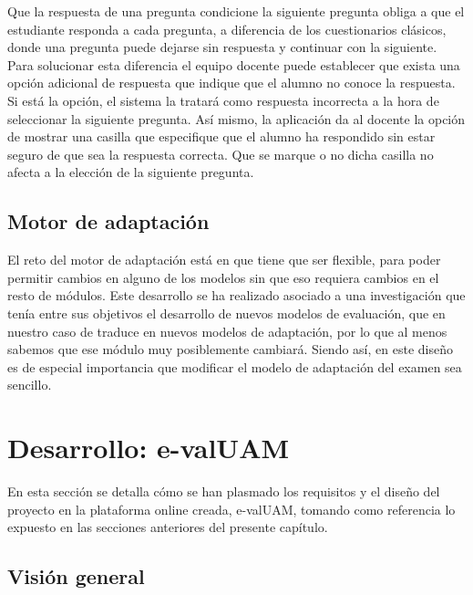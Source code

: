 Que la respuesta de una pregunta condicione la siguiente pregunta obliga a que el estudiante responda a cada pregunta, a diferencia de los cuestionarios clásicos, donde una pregunta puede dejarse sin respuesta y continuar con la siguiente. Para solucionar esta diferencia el equipo docente puede establecer que exista una opción adicional de respuesta que indique que el alumno no conoce la respuesta. Si está la opción, el sistema la tratará como respuesta incorrecta a la hora de seleccionar la siguiente pregunta. Así mismo, la aplicación da al docente la opción de mostrar una casilla que especifique que el alumno ha respondido sin estar seguro de que sea la respuesta correcta. Que se marque o no dicha casilla no afecta a la elección de la siguiente pregunta.


\subsection{Motor de adaptación}

El reto del motor de adaptación está en que tiene que ser flexible, para poder permitir cambios en alguno de los modelos sin que eso requiera cambios en el resto de módulos. Este desarrollo se ha realizado asociado a una investigación que tenía entre sus objetivos el desarrollo de nuevos modelos de evaluación, que en nuestro caso de traduce en nuevos modelos de adaptación, por lo que al menos sabemos que ese módulo muy posiblemente cambiará. Siendo así, en este diseño es de especial importancia que modificar el modelo de adaptación del examen sea sencillo.



\section{Desarrollo: e-valUAM\label{sec:desarrollo}}

En esta sección se detalla cómo se han plasmado los requisitos y el diseño del proyecto en la plataforma online creada, \acrshort{e-valUAM}, tomando como referencia lo expuesto en las secciones anteriores del presente capítulo.

\subsection{Visión general}

